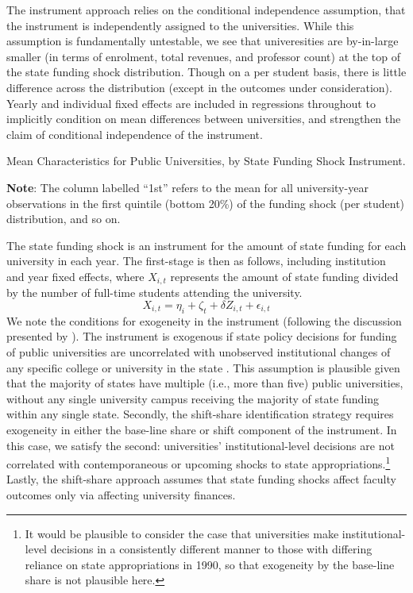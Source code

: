 The instrument approach relies on the conditional independence assumption, that the instrument is independently assigned to the universities.
While this assumption is fundamentally untestable, we see that univeresities are by-in-large smaller (in terms of enrolment, total revenues, and professor count) at the top of the state funding shock distribution.
Though on a per student basis, there is little difference across the distribution (except in the outcomes under consideration).
Yearly and individual fixed effects are included in regressions throughout to implicitly condition on mean differences between universities, and strengthen the claim of conditional independence of the instrument.

\begin{table}[h!]
    \singlespacing
    \caption{Mean Characteristics for Public Universities, by State Funding Shock Instrument.}
    \makebox[\textwidth][c]{}
    \label{tab:summary-quantiles}
    \footnotesize
    \textbf{Note}:
    The column labelled ``1st'' refers to the mean for all university-year observations in the first quintile (bottom 20\%) of the funding shock (per student) distribution, and so on.
\end{table}

The state funding shock is an instrument for the amount of state funding for each university in each year.  
The first-stage is then as follows, including institution and year fixed effects, where $X_{i,t}$ represents the amount of state funding divided by the number of full-time students attending the university.
\begin{equation}
    \label{eqn:firststage}
    X_{i,t} = \eta_i + \zeta_t + \delta Z_{i,t} + \epsilon_{i,t}
\end{equation}
We note the conditions for exogeneity in the instrument (following the discussion presented by \citealt{NBERw27885}).
The instrument is exogenous if state policy decisions for funding of public universities are uncorrelated with unobserved institutional changes of any specific college or university in the state \citep{borusyak2022quasi}.
This assumption is plausible given that the majority of states have multiple (i.e., more than five) public universities, without any single university campus receiving the majority of state funding within any single state.
Secondly, the shift-share identification strategy requires exogeneity in either the base-line share or shift component of the instrument.
In this case, we satisfy the second: universities' institutional-level decisions are not correlated with contemporaneous or upcoming shocks to state appropriations.\footnote{
    It would be plausible to consider the case that universities make institutional-level decisions in a consistently different manner to those 
    with differing reliance on state appropriations in 1990, so that exogeneity by the base-line share is not plausible here.
}
Lastly, the shift-share approach assumes that state funding shocks affect faculty outcomes only via affecting university finances.

